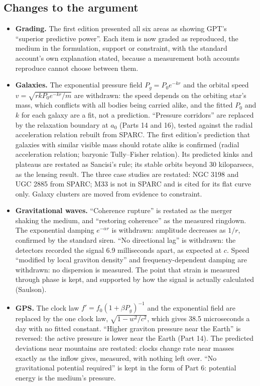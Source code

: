 \subsection*{Changes to the argument}
\begin{itemize}
\item \textbf{Grading.} The first edition presented all six areas as showing GPT's ``superior predictive power''. Each item is now graded as reproduced, the medium in the formulation, support or constraint, with the standard account's own explanation stated, because a measurement both accounts reproduce cannot choose between them.
\item \textbf{Galaxies.} The exponential pressure field $P_g = P_0e^{-kr}$ and the orbital speed $v = \sqrt{rkP_0e^{-kr}/m}$ are withdrawn: the speed depends on the orbiting star's mass, which conflicts with all bodies being carried alike, and the fitted $P_0$ and $k$ for each galaxy are a fit, not a prediction. ``Pressure corridors'' are replaced by the relaxation boundary at $a_0$ (Parts 14 and 16), tested against the radial acceleration relation rebuilt from SPARC. The first edition's prediction that galaxies with similar visible mass should rotate alike is confirmed (radial acceleration relation; baryonic Tully--Fisher relation). Its predicted kinks and plateaus are restated as Sancisi's rule; its stable orbits beyond 30 kiloparsecs, as the lensing result. The three case studies are restated: NGC 3198 and UGC 2885 from SPARC; M33 is not in SPARC and is cited for its flat curve only. Galaxy clusters are moved from evidence to constraint.
\item \textbf{Gravitational waves.} ``Coherence rupture'' is restated as the merger shaking the medium, and ``restoring coherence'' as the measured ringdown. The exponential damping $e^{-\alpha r}$ is withdrawn: amplitude decreases as $1/r$, confirmed by the standard siren. ``No directional lag'' is withdrawn: the detectors recorded the signal 6.9 milliseconds apart, as expected at $c$. Speed ``modified by local graviton density'' and frequency-dependent damping are withdrawn: no dispersion is measured. The point that strain is measured through phase is kept, and supported by how the signal is actually calculated (Saulson).
\item \textbf{GPS.} The clock law $f' = f_0(1+\beta P_g)^{-1}$ and the exponential field are replaced by the one clock law, $\sqrt{1-w^2/c^2}$, which gives 38.5 microseconds a day with no fitted constant. ``Higher graviton pressure near the Earth'' is reversed: the active pressure is lower near the Earth (Part 14). The predicted deviations near mountains are restated: clocks change rate near masses exactly as the inflow gives, measured, with nothing left over. ``No gravitational potential required'' is kept in the form of Part 6: potential energy is the medium's pressure.

\end{itemize}
